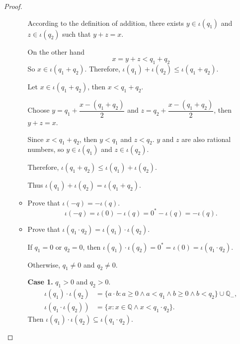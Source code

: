 \begin{proof}
\begin{itemize}
\begin{itemize}
                        According to the definition of addition, there exists $y\in\iota(q_{1})$ and $z\in\iota(q_{2})$ such that $y + z = x$.

                        On the other hand
                        \[
                            x = y + z < q_{1} + q_{2}
                        \]
                        So $x\in\iota(q_{1} + q_{2})$. Therefore, $\iota(q_{1}) + \iota(q_{2})\le\iota(q_{1} + q_{2})$.
                        \bigskip

                        Let $x\in\iota(q_{1} + q_{2})$, then $x < q_{1} + q_{2}$.

                        Choose $y = q_{1} + \dfrac{x - (q_{1} + q_{2})}{2}$ and $z = q_{2} + \dfrac{x - (q_{1} + q_{2})}{2}$, then $y + z = x$.

                        Since $x < q_{1} + q_{2}$, then $y < q_{1}$ and $z < q_{2}$. $y$ and $z$ are also rational numbers, so $y\in\iota(q_{1})$ and $z\in\iota(q_{2})$.

                        Therefore, $\iota(q_{1} + q_{2})\le\iota(q_{1}) + \iota(q_{2})$.

                        Thus $\iota(q_{1}) + \iota(q_{2}) = \iota(q_{1} + q_{2})$.
                  \item Prove that $\iota(-q) = - \iota(q)$.
                        \[
                            \iota(-q) = \iota(0) - \iota(q) = {0}^{*} - \iota(q) = -\iota(q).
                        \]
                  \item Prove that $\iota(q_{1}\cdot q_{2}) = \iota(q_{1})\cdot\iota(q_{2})$.

                        If $q_{1} = 0$ or $q_{2} = 0$, then $\iota(q_{1})\cdot\iota(q_{2}) = {0}^{*} = \iota(0) = \iota(q_{1}\cdot q_{2})$.

                        Otherwise, $q_{1}\ne 0$ and $q_{2}\ne 0$.

                        \textbf{Case 1.} $q_{1} > 0$ and $q_{2} > 0$.
                        \[
                            \begin{split}
                                \iota(q_{1})\cdot\iota(q_{2}) & = \{ a\cdot b : a\ge 0\land a < q_{1}\land b\ge 0\land b < q_{2} \}\cup\mathbb{Q}_{-}, \\
                                \iota(q_{1}\cdot\iota(q_{2})) & = \{ x: x\in\mathbb{Q}\land x < q_{1}\cdot q_{2} \}.
                            \end{split}
                        \]
                        Then $\iota(q_{1})\cdot\iota(q_{2})\subseteq\iota(q_{1}\cdot q_{2})$.


\end{itemize}
\end{itemize}
\end{proof}
